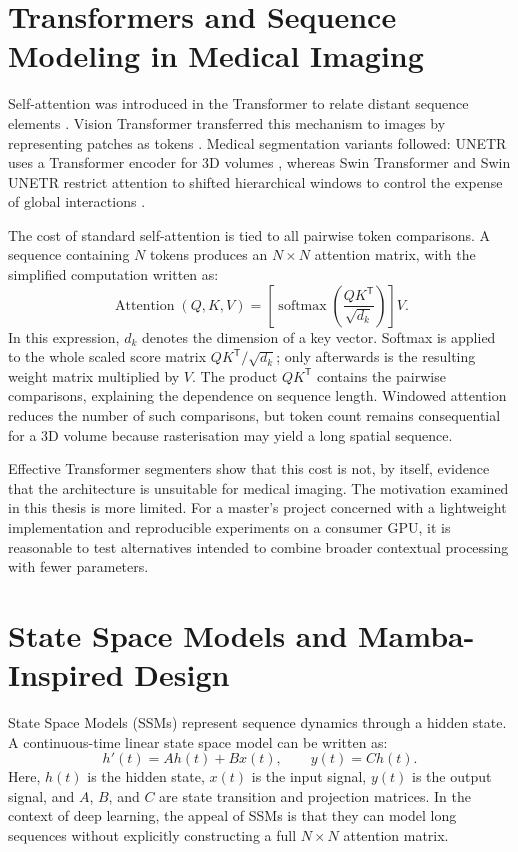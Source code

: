 \section{Transformers and Sequence Modeling in Medical Imaging}
Self-attention was introduced in the Transformer to relate distant sequence elements \citep{vaswani2017attention}. Vision Transformer transferred this mechanism to images by representing patches as tokens \citep{dosovitskiy2020image}. Medical segmentation variants followed: UNETR uses a Transformer encoder for 3D volumes \citep{hatamizadeh2022unetr}, whereas Swin Transformer and Swin UNETR restrict attention to shifted hierarchical windows to control the expense of global interactions \citep{liu2021swin,hatamizadeh2022swin}.

The cost of standard self-attention is tied to all pairwise token comparisons. A sequence containing $N$ tokens produces an $N\times N$ attention matrix, with the simplified computation written as:
\begin{equation}
    \operatorname{Attention}(Q,K,V)
    =\left[
      \operatorname{softmax}\!\left(
        \frac{QK^{\mathsf{T}}}{\sqrt{d_k}}
      \right)
    \right]V.
\end{equation}
In this expression, \(d_k\) denotes the dimension of a key vector. Softmax is
applied to the whole scaled score matrix
\(QK^{\mathsf{T}}/\sqrt{d_k}\); only afterwards is the resulting weight matrix
multiplied by \(V\). The product \(QK^{\mathsf{T}}\) contains the pairwise
comparisons, explaining the dependence on sequence length. Windowed attention
reduces the number of such comparisons, but token count remains consequential
for a 3D volume because rasterisation may yield a long spatial sequence.

Effective Transformer segmenters show that this cost is not, by itself, evidence that the architecture is unsuitable for medical imaging. The motivation examined in this thesis is more limited. For a master's project concerned with a lightweight implementation and reproducible experiments on a consumer GPU, it is reasonable to test alternatives intended to combine broader contextual processing with fewer parameters.

\section{State Space Models and Mamba-Inspired Design}
State Space Models (SSMs) represent sequence dynamics through a hidden state. A continuous-time linear state space model can be written as:
\begin{equation}
    h'(t)=Ah(t)+Bx(t), \qquad y(t)=Ch(t).
\end{equation}
Here, $h(t)$ is the hidden state, $x(t)$ is the input signal, $y(t)$ is the output signal, and $A$, $B$, and $C$ are state transition and projection matrices. In the context of deep learning, the appeal of SSMs is that they can model long sequences without explicitly constructing a full $N\times N$ attention matrix.

